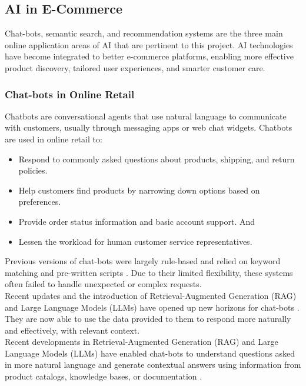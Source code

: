 \subsection{AI in E\texorpdfstring{-}{-}Commerce}
Chat-bots, semantic search, and recommendation systems are the three main online application areas of AI that are pertinent to this project. AI technologies have become integrated to better e-commerce platforms, enabling more effective product discovery, tailored user experiences, and smarter customer care.

\subsubsection{Chat-bots in Online Retail}

Chatbots are conversational agents that use natural language to communicate with customers, usually through messaging apps or web chat widgets\cite{adamopoulou2020chatbots}. Chatbots are used in online retail to: 

\begin{itemize}
  \item Respond to commonly asked questions about products, shipping, and return policies.
  \item Help customers find products by narrowing down options based on preferences. 
  \item Provide order status information and basic account support. And 
  \item Lessen the workload for human customer service representatives.
\end{itemize}

Previous versions of chat-bots were largely rule-based and relied on keyword matching and pre-written scripts \cite{adamopoulou2020chatbots}. Due to their limited flexibility, these systems often failed to handle unexpected or complex requests. \\
Recent updates and the introduction of Retrieval-Augmented Generation (RAG) and Large Language Models (LLMs) have opened up new horizons for chat-bots \cite{adamopoulou2020chatbots}. They are now able to use the data provided to them to respond more naturally and effectively, with relevant context. \\
Recent developments in Retrieval-Augmented Generation (RAG) and Large Language Models (LLMs) have enabled chat-bots to understand questions asked in more natural language and generate contextual answers using information from product catalogs, knowledge bases, or documentation \cite{lewis2020retrieval}.

